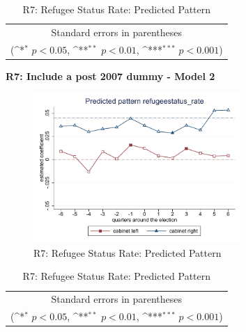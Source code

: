 \documentclass[10pt,a4paper]{scrartcl}
\begin{document}
\begin{table}[!ht]\centering
	\renewcommand{\arraystretch}{1.25}
	\def\sym#1{\ifmmode^{#1}\else\(^{#1}\)\fi}
	\caption{R7: Refugee Status Rate: Predicted Pattern}
	\begin{tabular}{l*{2}{c}}
		\hline\hline
		
		\hline\hline
		\multicolumn{3}{c}{\footnotesize Standard errors in parentheses} \\
		\multicolumn{3}{c}{\footnotesize (\sym{*} \(p<0.05\), \sym{**} \(p<0.01\), \sym{***} \(p<0.001\))}\\
	\end{tabular}
\end{table}

\clearpage
\textbf{R7: Include a post 2007 dummy - Model 2}
\begin{figure}[!ht]
	\centering
	\includegraphics[width=0.7\textwidth]{figures_edited/refugeestatus_rate_graph2_R7.pdf}
	\caption{R7: Refugee Status Rate: Predicted Pattern}
\end{figure}

\begin{table}[!ht]\centering
	\footnotesize
	\renewcommand{\arraystretch}{1.2}
	\def\sym#1{\ifmmode^{#1}\else\(^{#1}\)\fi}
	\caption{R7: Refugee Status Rate: Predicted Pattern}
	\begin{tabular}{l*{2}{c}}
		\hline\hline
		
		\hline\hline
		\multicolumn{3}{c}{\footnotesize Standard errors in parentheses} \\
		\multicolumn{3}{c}{\footnotesize (\sym{*} \(p<0.05\), \sym{**} \(p<0.01\), \sym{***} \(p<0.001\))} \\
	\end{tabular}
\end{table}
\end{document}
